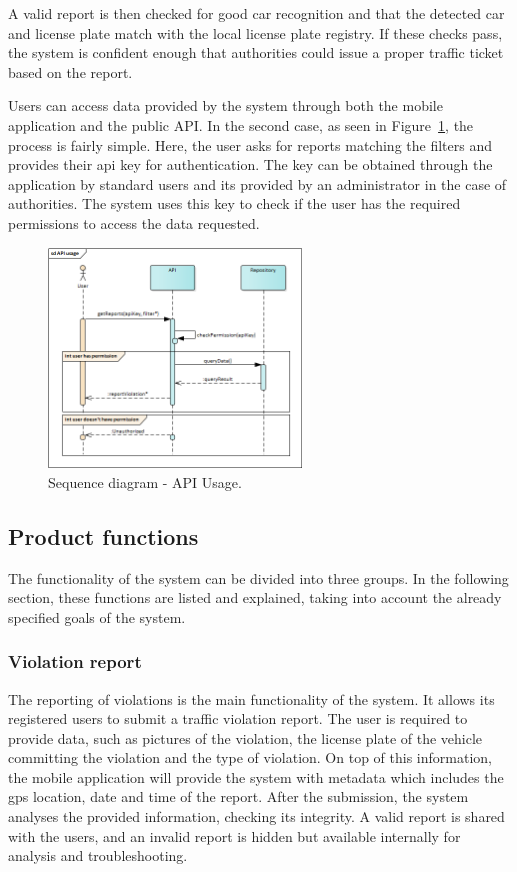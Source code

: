 A valid report is then checked for good car recognition and that the detected car and license plate match with the local license plate registry. If these checks pass, the system is confident enough that authorities could issue a proper traffic ticket based on the report.

Users can access data provided by the system through both the mobile application and the public API. In the second case, as seen in Figure~\ref{fig:api-usage}, the process is fairly simple. Here, the user asks for reports matching the filters and provides their api key for authentication. The key can be obtained through the application by standard users and its provided by an administrator in the case of authorities. The system uses this key to check if the user has the required permissions to access the data requested.

\begin{figure}[H]
\centering
\includegraphics[width=0.6\textwidth]{Images/api-usage.png}
\caption{\label{fig:api-usage}Sequence diagram - API Usage.}
\end{figure}

\subsection{Product functions}
The functionality of the system can be divided into three groups. In the following section, these functions are listed and explained, taking into account the already specified goals of the system.

\subsubsection{Violation report}
The reporting of violations is the main functionality of the system. It allows its registered users to submit a traffic violation report. The user is required to provide data, such as pictures of the violation, the license plate of the vehicle committing the violation and the type of violation. On top of this information, the mobile application will provide the system with metadata which includes the gps location, date and time of the report.
After the submission, the system analyses the provided information, checking its integrity. A valid report is shared with the users, and an invalid report is hidden but available internally for analysis and troubleshooting.

